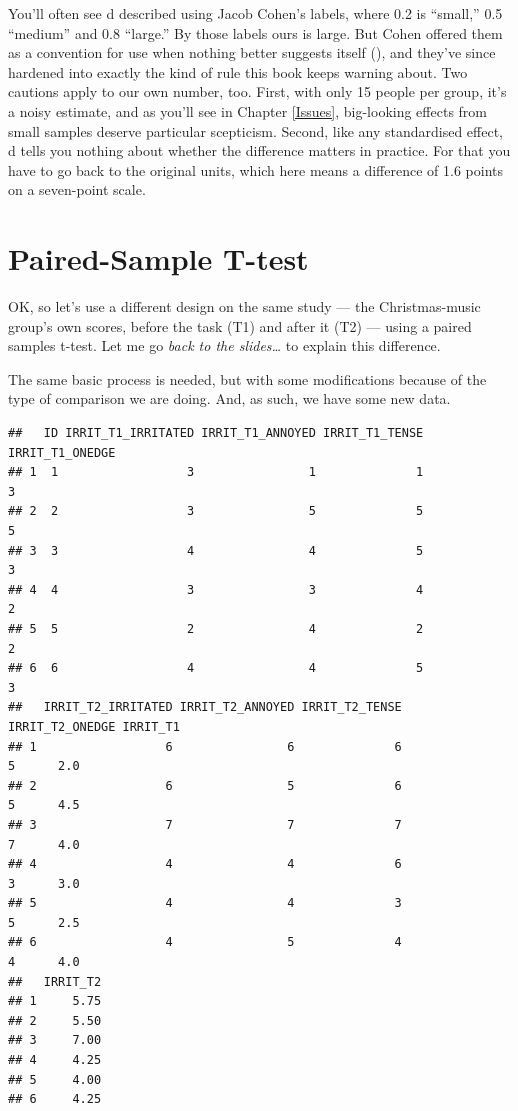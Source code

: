 \documentclass[
]{book}
\begin{document}
You'll often see d described using Jacob Cohen's labels, where 0.2 is ``small,'' 0.5 ``medium'' and 0.8 ``large.'' By those labels ours is large. But Cohen offered them as a convention for use when nothing better suggests itself (), and they've since hardened into exactly the kind of rule this book keeps warning about. Two cautions apply to our own number, too. First, with only 15 people per group, it's a noisy estimate, and as you'll see in Chapter \ref{Issues}, big-looking effects from small samples deserve particular scepticism. Second, like any standardised effect, d tells you nothing about whether the difference matters in practice. For that you have to go back to the original units, which here means a difference of 1.6 points on a seven-point scale.

\section{Paired-Sample T-test}\label{paired-sample-t-test}

OK, so let's use a different design on the same study --- the Christmas-music group's own scores, before the task (T1) and after it (T2) --- using a paired samples t-test. Let me go \emph{back to the slides\ldots{}} to explain this difference.

The same basic process is needed, but with some modifications because of the type of comparison we are doing. And, as such, we have some new data.

\begin{verbatim}
##   ID IRRIT_T1_IRRITATED IRRIT_T1_ANNOYED IRRIT_T1_TENSE IRRIT_T1_ONEDGE
## 1  1                  3                1              1               3
## 2  2                  3                5              5               5
## 3  3                  4                4              5               3
## 4  4                  3                3              4               2
## 5  5                  2                4              2               2
## 6  6                  4                4              5               3
##   IRRIT_T2_IRRITATED IRRIT_T2_ANNOYED IRRIT_T2_TENSE IRRIT_T2_ONEDGE IRRIT_T1
## 1                  6                6              6               5      2.0
## 2                  6                5              6               5      4.5
## 3                  7                7              7               7      4.0
## 4                  4                4              6               3      3.0
## 5                  4                4              3               5      2.5
## 6                  4                5              4               4      4.0
##   IRRIT_T2
## 1     5.75
## 2     5.50
## 3     7.00
## 4     4.25
## 5     4.00
## 6     4.25
\end{verbatim}
\end{document}
